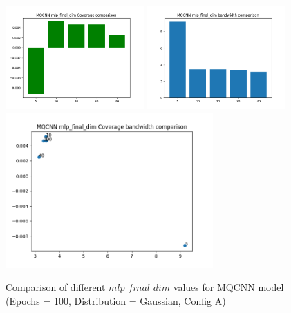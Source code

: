 \documentclass[a4paper, 12pt]{article}
\begin{document}
\begin{figure}[!h]
    \centering
    \includegraphics[width=200px]{plots/hist/a/MQCNN/mlp_final_dim/Coverage.png}
    \includegraphics[width=200px]{plots/hist/a/MQCNN/mlp_final_dim/bandwidth.png}
    \includegraphics[width=300px]{plots/scatter/a/MQCNN/mlp_final_dim/Coverage_bandwidth.png}
    \caption{Comparison of different $mlp\_final\_dim$ values for MQCNN model (Epochs = 100, Distribution = Gaussian, Config A)}
    \label{fig:comp_mqcnn}
\end{figure}
\end{document}
